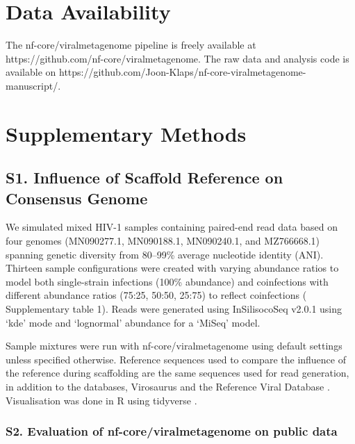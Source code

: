 
\section*{Data Availability}
The nf-core/viralmetagenome pipeline is freely available at https://github.com/nf-core/viralmetagenome.
The raw data and analysis code is available on https://github.com/Joon-Klaps/nf-core-viralmetagenome-manuscript/.

\section*{Supplementary Methods}


\subsection*{S1. Influence of Scaffold Reference on Consensus Genome}

We simulated mixed  HIV-1 samples containing paired-end read data based on four genomes (MN090277.1, MN090188.1, MN090240.1, and MZ766668.1) spanning genetic diversity from 80–99\% average nucleotide identity (ANI). Thirteen sample configurations were created with varying abundance ratios to model both single-strain infections (100\% abundance) and coinfections with different abundance ratios (75:25, 50:50, 25:75) to reflect coinfections ( Supplementary table 1). Reads were generated using InSilisocoSeq v2.0.1 \cite{Gourle2019-ox} using ‘kde’ mode and ‘lognormal’ abundance for a ‘MiSeq’ model.

Sample mixtures were run with nf-core/viralmetagenome using default settings unless specified otherwise. Reference sequences used to compare the influence of the reference during scaffolding are the same sequences used for read generation, in addition to the databases, Virosaurus \cite{Gleizes2020-rq} and the Reference Viral Database \cite{Goodacre2018-dw}. Visualisation was done in R \cite{R_Core_Team2021-ow} using tidyverse \cite{Wickham2019-vr}.


\subsubsection*{S2. Evaluation of nf-core/viralmetagenome on public data}


